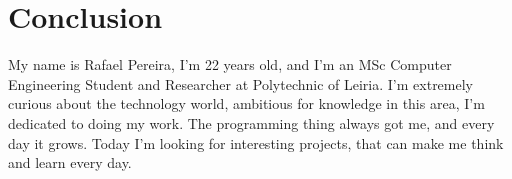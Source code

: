 \documentclass[a4paper,fleqn]{cas-dc}
\begin{document}
\section{Conclusion}
\label{conclusion}
\printcredits

%
%




My name is Rafael Pereira, I'm 22 years old, and I'm an MSc Computer Engineering Student and Researcher at Polytechnic of Leiria. I'm extremely curious about the technology world, ambitious for knowledge in this area, I'm dedicated to doing my work. The programming thing always got me, and every day it grows. Today I'm looking for interesting projects, that can make me think and learn every day.
\endbio
\end{document}
